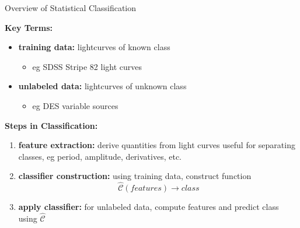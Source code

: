 \documentclass[12pt]{beamer}
\begin{document}
\begin{frame}{Overview of Statistical Classification}

\textbf{Key Terms:}
\begin{itemize}
\item \textbf{training data:} lightcurves of known class
  \begin{itemize}
  \item eg SDSS Stripe 82 light curves
  \end{itemize}
\item \textbf{unlabeled data:} lightcurves of unknown class
  \begin{itemize}
  \item eg DES variable sources
  \end{itemize}
\end{itemize}

\vspace{.2in}

\textbf{Steps in Classification:}
\begin{enumerate}
\item \textbf{feature extraction:} derive quantities from light curves useful for separating classes, eg period, amplitude, derivatives, etc.
\item \textbf{classifier construction:} using training data, construct function
\begin{equation*}
\widehat{\mathcal{C}}(features) \rightarrow class
\end{equation*} 
\item \textbf{apply classifier:} for unlabeled data, compute features and predict class using $\widehat{\mathcal{C}}$
\end{enumerate}
\end{frame}
\end{document}

